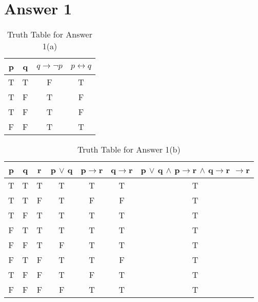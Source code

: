 \documentclass[12pt]{article}
\begin{document}
\section*{Answer 1}


\begin{table}[h]
\small
\centering
\caption{Truth Table for Answer 1(a)}
\label{table:example}
\begin{tabular}{|c|c|c|c|}	%
\hline 							%
\textbf{p} & \textbf{q} & \textbf{$q \rightarrow  \neg p$} & \textbf{$p \leftrightarrow q$} \\%
\hline 
\hline 
T & T & F & T \\			%
T & F & T & F \\
T & F & T & F \\
F & F & T & T \\
\hline 

\end{tabular}
\end{table}



\begin{table}[h]
\small
\centering
\caption{Truth Table for Answer 1(b)}
\label{table:example}
\begin{tabular}{|c|c|c|c|c|c|c}	%
\hline 							%
\textbf{p} & \textbf{q} & \textbf{r} & \textbf{p $\vee$ q} & \textbf{p$\rightarrow$r} & \textbf{q$\rightarrow$r} & \textbf{p $\vee$ q $\wedge$ p$\rightarrow$r $\wedge$ q$\rightarrow$r $\rightarrow$r} \\%
\hline 
\hline 
T & T & T & T & T & T & T \\			%
T & T & F & T & F & F & T \\
T & F & T & T & T & T & T \\
F & T & T & T & T & T & T \\
F & F & T & F & T & T & T \\
F & T & F & T & T & F & T \\
T & F & F & T & F & T & T \\
F & F & F & F & T & T & T \\
\hline 

\end{tabular}
\end{table}
\end{document}
